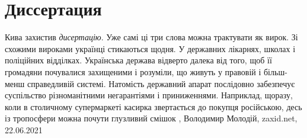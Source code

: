  
 
 
 
 
\chapter{Диссертация}

Кива захистив \emph{дисертацію}. Уже самі ці три слова можна трактувати як вирок. Зі
схожими вироками українці стикаються щодня. У державних лікарнях, школах і
поліційних відділках. Українська держава відверто далека від того, щоб її
громадяни почувалися захищеними і розуміли, що живуть у правовій і більш-менш
справедливій системі. Натомість державний апарат послідовно забезпечує
суспільство різноманітними негарантіями і приниженнями. Наприклад, щоразу, коли
в столичному супермаркеті касирка звертається до покупця російською, десь із
тропосфери можна почути глузливий смішок
, 
Володимир Молодій, zaxid.net, 22.06.2021

